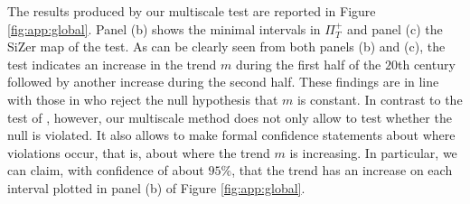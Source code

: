 The results produced by our multiscale test are reported in Figure \ref{fig:app:global}. Panel (b) shows the minimal intervals in $\Pi_T^+$ and panel (c) the SiZer map of the test. As can be clearly seen from both panels (b) and (c), the test indicates an increase in the trend $m$ during the first half of the $20$th century followed by another increase during the second half. These findings are in line with those in \cite{WuWoodroofeMentz2001} who reject the null hypothesis that $m$ is constant. In contrast to the test of \cite{WuWoodroofeMentz2001}, however, our multiscale method does not only allow to test whether the null is violated. It also allows to make formal confidence statements about where violations occur, that is, about where the trend $m$ is increasing. In particular, we can claim, with confidence of about $95\%$, that the trend has an increase on each interval plotted in panel (b) of Figure \ref{fig:app:global}. 


